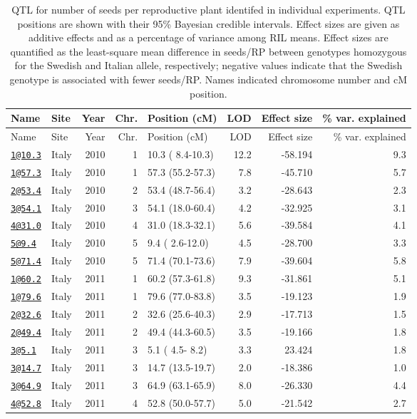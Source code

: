\documentclass[]{article}
\begin{document}
\begin{longtable}[]{@{}llrrlrrr@{}}
\caption{\label{tab:individual-tofu-qtl}QTL for number of seeds per reproductive plant identifed in individual experiments. QTL positions are shown with their 95\% Bayesian credible intervals. Effect sizes are given as additive effects and as a percentage of variance among RIL means. Effect sizes are quantified as the least-square mean difference in seeds/RP between genotypes homozygous for the Swedish and Italian allele, respectively; negative values indicate that the Swedish genotype is associated with fewer seeds/RP. Names indicated chromosome number and cM position.}\tabularnewline
\toprule
Name & Site & Year & Chr. & Position (cM) & LOD & Effect size & \% var. explained\tabularnewline
\midrule
\endfirsthead
\toprule
Name & Site & Year & Chr. & Position (cM) & LOD & Effect size & \% var. explained\tabularnewline
\midrule
\endhead
\href{mailto:1@10.3}{\nolinkurl{1@10.3}} & Italy & 2010 & 1 & 10.3 ( 8.4-10.3) & 12.2 & -58.194 & 9.3\tabularnewline
\href{mailto:1@57.3}{\nolinkurl{1@57.3}} & Italy & 2010 & 1 & 57.3 (55.2-57.3) & 7.8 & -45.710 & 5.7\tabularnewline
\href{mailto:2@53.4}{\nolinkurl{2@53.4}} & Italy & 2010 & 2 & 53.4 (48.7-56.4) & 3.2 & -28.643 & 2.3\tabularnewline
\href{mailto:3@54.1}{\nolinkurl{3@54.1}} & Italy & 2010 & 3 & 54.1 (18.0-60.4) & 4.2 & -32.925 & 3.1\tabularnewline
\href{mailto:4@31.0}{\nolinkurl{4@31.0}} & Italy & 2010 & 4 & 31.0 (18.3-32.1) & 5.6 & -39.584 & 4.1\tabularnewline
\href{mailto:5@9.4}{\nolinkurl{5@9.4}} & Italy & 2010 & 5 & 9.4 ( 2.6-12.0) & 4.5 & -28.700 & 3.3\tabularnewline
\href{mailto:5@71.4}{\nolinkurl{5@71.4}} & Italy & 2010 & 5 & 71.4 (70.1-73.6) & 7.9 & -39.604 & 5.8\tabularnewline
\href{mailto:1@60.2}{\nolinkurl{1@60.2}} & Italy & 2011 & 1 & 60.2 (57.3-61.8) & 9.3 & -31.861 & 5.1\tabularnewline
\href{mailto:1@79.6}{\nolinkurl{1@79.6}} & Italy & 2011 & 1 & 79.6 (77.0-83.8) & 3.5 & -19.123 & 1.9\tabularnewline
\href{mailto:2@32.6}{\nolinkurl{2@32.6}} & Italy & 2011 & 2 & 32.6 (25.6-40.3) & 2.9 & -17.713 & 1.5\tabularnewline
\href{mailto:2@49.4}{\nolinkurl{2@49.4}} & Italy & 2011 & 2 & 49.4 (44.3-60.5) & 3.5 & -19.166 & 1.8\tabularnewline
\href{mailto:3@5.1}{\nolinkurl{3@5.1}} & Italy & 2011 & 3 & 5.1 ( 4.5- 8.2) & 3.3 & 23.424 & 1.8\tabularnewline
\href{mailto:3@14.7}{\nolinkurl{3@14.7}} & Italy & 2011 & 3 & 14.7 (13.5-19.7) & 2.0 & -18.386 & 1.0\tabularnewline
\href{mailto:3@64.9}{\nolinkurl{3@64.9}} & Italy & 2011 & 3 & 64.9 (63.1-65.9) & 8.0 & -26.330 & 4.4\tabularnewline
\href{mailto:4@52.8}{\nolinkurl{4@52.8}} & Italy & 2011 & 4 & 52.8 (50.0-57.7) & 5.0 & -21.542 & 2.7\tabularnewline

\end{longtable}
\end{document}
